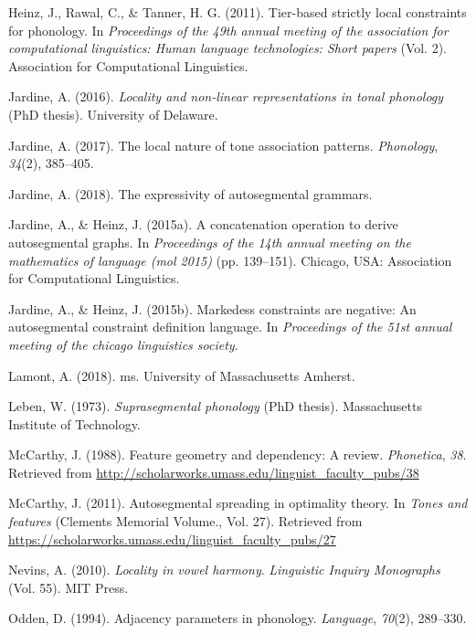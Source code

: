 \documentclass[,doc,floatsintext]{apa6}
\theoremstyle{definition}
\theoremstyle{definition}
\theoremstyle{definition}
\theoremstyle{remark}
\begin{document}
\hypertarget{ref-heinzetaltsl}{}
Heinz, J., Rawal, C., \& Tanner, H. G. (2011). Tier-based strictly local
constraints for phonology. In \emph{Proceedings of the 49th annual
meeting of the association for computational linguistics: Human language
technologies: Short papers} (Vol. 2). Association for Computational
Linguistics.

\hypertarget{ref-jardinediss}{}
Jardine, A. (2016). \emph{Locality and non-linear representations in
tonal phonology} (PhD thesis). University of Delaware.

\hypertarget{ref-jardinelocaltone}{}
Jardine, A. (2017). The local nature of tone association patterns.
\emph{Phonology}, \emph{34}(2), 385--405.

\hypertarget{ref-jardineexpressag}{}
Jardine, A. (2018). The expressivity of autosegmental grammars.

\hypertarget{ref-jardineheinz2015}{}
Jardine, A., \& Heinz, J. (2015a). A concatenation operation to derive
autosegmental graphs. In \emph{Proceedings of the 14th annual meeting on
the mathematics of language (mol 2015)} (pp. 139--151). Chicago, USA:
Association for Computational Linguistics.

\hypertarget{ref-jardineheinzcls}{}
Jardine, A., \& Heinz, J. (2015b). Markedess constraints are negative:
An autosegmental constraint definition language. In \emph{Proceedings of
the 51st annual meeting of the chicago linguistics society}.

\hypertarget{ref-lamont2018}{}
Lamont, A. (2018). ms. University of Massachusetts Amherst.

\hypertarget{ref-leben1973}{}
Leben, W. (1973). \emph{Suprasegmental phonology} (PhD thesis).
Massachusetts Institute of Technology.

\hypertarget{ref-mccarthyfg1988}{}
McCarthy, J. (1988). Feature geometry and dependency: A review.
\emph{Phonetica}, \emph{38}. Retrieved from
\url{http://scholarworks.umass.edu/linguist_faculty_pubs/38}

\hypertarget{ref-mccarthy2011}{}
McCarthy, J. (2011). Autosegmental spreading in optimality theory. In
\emph{Tones and features} (Clements Memorial Volume., Vol. 27).
Retrieved from
\url{https://scholarworks.umass.edu/linguist_faculty_pubs/27}

\hypertarget{ref-Nevins2010}{}
Nevins, A. (2010). \emph{Locality in vowel harmony}. \emph{Linguistic
Inquiry Monographs} (Vol. 55). MIT Press.

\hypertarget{ref-odden1994}{}
Odden, D. (1994). Adjacency parameters in phonology. \emph{Language},
\emph{70}(2), 289--330.
\end{document}
